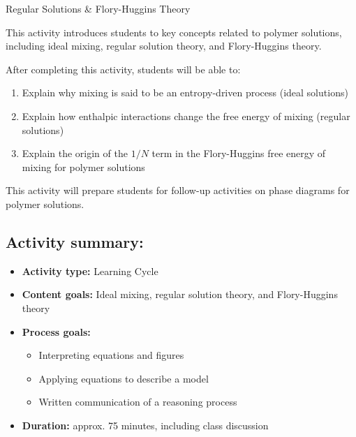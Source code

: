 %
%
%
%

\renewcommand{\figpath}{content/polymphys/solution-thermo/flory-huggins/figs}
\renewcommand{\labelbase}{flory-huggins}

\begin{activity}{Regular Solutions \& Flory-Huggins Theory}

\begin{instructornotes}

	This activity introduces students to key concepts related to polymer solutions, including ideal mixing, regular solution theory, and Flory-Huggins theory.
	
	After completing this activity, students will be able to:
			\begin{enumerate}
				\item Explain why mixing is said to be an entropy-driven process (ideal solutions)
				\item Explain how enthalpic interactions change the free energy of mixing (regular solutions)
				\item Explain the origin of the $1/N$ term in the Flory-Huggins free energy of mixing for polymer solutions
			\end{enumerate}
	This activity will prepare students for follow-up activities on phase diagrams for polymer solutions.
			
	\subsection*{Activity summary:}
	\begin{itemize}
		\item \textbf{Activity type:} Learning Cycle
		\item \textbf{Content goals:} Ideal mixing, regular solution theory, and Flory-Huggins theory
		\item \textbf{Process goals:} %
			\begin{itemize}
				\item Interpreting equations and figures
				\item Applying equations to describe a model
				\item Written communication of a reasoning process
			\end{itemize}
		\item \textbf{Duration:} approx. 75 minutes, including class discussion
		

\end{itemize}
\end{instructornotes}
\end{activity}
